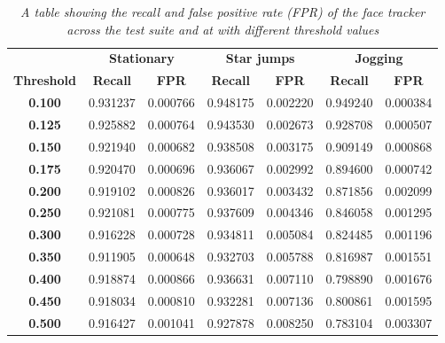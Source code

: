\begin{table}[]
    \begin{tabular}{c|cc|cc|cc}
    \textbf{} & \multicolumn{2}{c|}{\textbf{Stationary}} & \multicolumn{2}{c|}{\textbf{Star jumps}} & \multicolumn{2}{c}{\textbf{Jogging}} \\
    \textbf{Threshold} & \textbf{Recall} & \textbf{FPR} & \textbf{Recall} & \textbf{FPR} & \textbf{Recall} & \textbf{FPR} \\ \hline
    \textbf{0.100} & 0.931237 & 0.000766 & 0.948175 & 0.002220 & 0.949240 & 0.000384 \\
    \textbf{0.125} & 0.925882 & 0.000764 & 0.943530 & 0.002673 & 0.928708 & 0.000507 \\
    \textbf{0.150} & 0.921940 & 0.000682 & 0.938508 & 0.003175 & 0.909149 & 0.000868 \\
    \textbf{0.175} & 0.920470 & 0.000696 & 0.936067 & 0.002992 & 0.894600 & 0.000742 \\
    \textbf{0.200} & 0.919102 & 0.000826 & 0.936017 & 0.003432 & 0.871856 & 0.002099 \\
    \textbf{0.250} & 0.921081 & 0.000775 & 0.937609 & 0.004346 & 0.846058 & 0.001295 \\
    \textbf{0.300} & 0.916228 & 0.000728 & 0.934811 & 0.005084 & 0.824485 & 0.001196 \\
    \textbf{0.350} & 0.911905 & 0.000648 & 0.932703 & 0.005788 & 0.816987 & 0.001551 \\
    \textbf{0.400} & 0.918874 & 0.000866 & 0.936631 & 0.007110 & 0.798890 & 0.001676 \\
    \textbf{0.450} & 0.918034 & 0.000810 & 0.932281 & 0.007136 & 0.800861 & 0.001595 \\
    \textbf{0.500} & 0.916427 & 0.001041 & 0.927878 & 0.008250 & 0.783104 & 0.003307
    \end{tabular}
    \caption{\textit{A table showing the recall and false positive rate (FPR) of the face tracker across the test suite and at with different threshold values}}
    \end{table}

